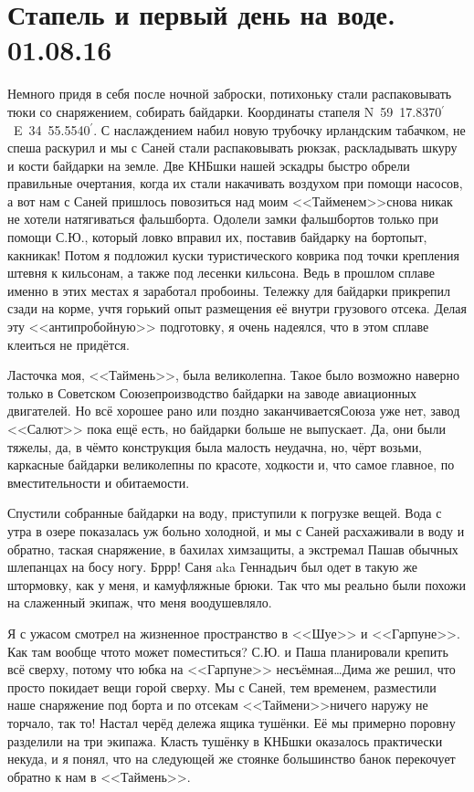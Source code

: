 \chapter{Стапель и первый день на воде. 01.08.16} 

Немного придя в себя после ночной заброски, потихоньку стали распаковывать тюки со снаряжением, собирать байдарки. Координаты стапеля N~59\degree~17.8370$^\prime$~E~34\degree~55.5540$^\prime$. С наслаждением  набил новую трубочку ирландским табачком, не спеша раскурил и мы с Саней стали распаковывать рюкзак, раскладывать шкуру и кости байдарки на земле. Две КНБ\sdash шки нашей эскадры быстро обрели правильные очертания, когда их стали накачивать воздухом при помощи насосов, а вот нам с Саней пришлось повозиться над моим <<Тайменем>>\mdash снова никак не хотели натягиваться фальшборта. Одолели замки фальшбортов только при помощи С.Ю., который ловко вправил их, поставив байдарку на борт\mdash опыт, как\sdash никак! Потом я подложил куски туристического коврика под точки крепления штевня к кильсонам, а также под лесенки кильсона. Ведь в прошлом сплаве именно в этих местах я заработал пробоины. Тележку для байдарки прикрепил сзади на корме, учтя горький опыт размещения её внутри грузового отсека. Делая эту <<антипробойную>> подготовку, я очень надеялся, что в этом сплаве клеиться не придётся. 

Ласточка моя, <<Таймень>>, была великолепна. Такое было возможно наверно только в Советском Союзе\mdash производство байдарки на заводе авиационных двигателей. Но всё хорошее рано или поздно заканчивается\mdash Союза уже нет, завод <<Салют>> пока ещё есть, но байдарки больше не выпускает. Да, они были тяжелы, да, в чём\sdash то конструкция была малость неудачна, но, чёрт возьми, каркасные байдарки великолепны по красоте, ходкости и, что самое главное, по вместительности и обитаемости.

Спустили собранные байдарки на воду, приступили к погрузке вещей. Вода с утра в озере показалась уж больно холодной, и мы с Саней расхаживали в воду и обратно, таская снаряжение, в бахилах химзащиты, а экстремал Паша\mdash в обычных шлепанцах на босу ногу. Бр\sdash р\sdash р! Саня aka Геннадьич был одет в такую же штормовку, как у меня, и камуфляжные брюки. Так что мы реально были похожи на слаженный экипаж, что меня воодушевляло. 

Я с ужасом смотрел на жизненное пространство в <<Шуе>> и <<Гарпуне>>. Как там вообще что\sdash то может поместиться? С.Ю. и Паша планировали крепить всё сверху, потому что юбка на <<Гарпуне>> несъёмная\ldots Дима же решил, что просто покидает вещи горой сверху. Мы с Саней, тем временем, разместили наше снаряжение под борта и по отсекам <<Таймени>>\mdash ничего наружу не торчало, так то! Настал черёд дележа ящика тушёнки. Её мы примерно поровну разделили на три экипажа. Класть тушёнку в КНБ\sdash шки оказалось практически некуда, и я понял, что на следующей же стоянке большинство банок перекочует обратно к  нам в <<Таймень>>.

